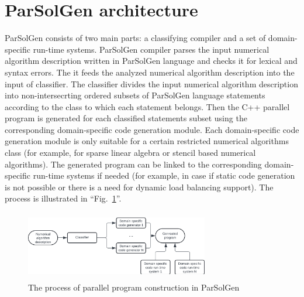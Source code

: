 \documentclass[conference]{IEEEtran}
\begin{document}
\section{ParSolGen architecture}
ParSolGen consists of two main parts: a classifying compiler and a set of domain-specific run-time systems. 
ParSolGen compiler parses the input numerical algorithm description written in ParSolGen language and checks it 
for lexical and syntax errors. The it feeds the analyzed numerical algorithm description into 
the input of classifier. The classifier divides the input numerical algorithm description into non-intersecrting 
ordered subsets of ParSolGen language statements according to the class to which each statement belongs. Then 
the C++ parallel program is generated for each classified statements subset using the corresponding domain-specific 
code generation module. Each domain-specific code generation module is only suitable for a certain restricted 
numerical algorithms class (for example, for sparse linear algebra or stencil based numerical algorithms). 
The generated program can be 
linked to the corresponding domain-specific run-time systems if needed (for example, in case if static code generation is not possible or there is a need for dynamic load balancing support).
The process is illustrated in ``Fig.~\ref{fig_2}''.

\begin{figure}[htbp]
	\centerline{\includegraphics[width=8cm, height=3cm]{fig_2.png}}
	\caption{The process of parallel program construction in ParSolGen}
	\label{fig_2}
\end{figure}
\end{document}
